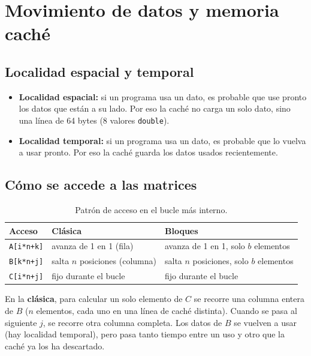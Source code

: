 \documentclass[11pt]{article}
\begin{document}
\section{Movimiento de datos y memoria caché}

\subsection{Localidad espacial y temporal}

\begin{itemize}
\item \textbf{Localidad espacial:} si un programa usa un dato, es probable que
      use pronto los datos que están a su lado. Por eso la caché no carga un
      solo dato, sino una línea de 64 bytes (8 valores \texttt{double}).
\item \textbf{Localidad temporal:} si un programa usa un dato, es probable que
      lo vuelva a usar pronto. Por eso la caché guarda los datos usados
      recientemente.
\end{itemize}

\subsection{Cómo se accede a las matrices}

\begin{table}[H]
\centering
\caption{Patrón de acceso en el bucle más interno.}
\label{tab:patron}
\begin{tabular}{lll}
\toprule
Acceso & Clásica & Bloques \\
\midrule
\texttt{A[i*n+k]} & avanza de 1 en 1 (fila) & avanza de 1 en 1, solo $b$ elementos \\
\texttt{B[k*n+j]} & salta $n$ posiciones (columna) & salta $n$ posiciones, solo $b$ elementos \\
\texttt{C[i*n+j]} & fijo durante el bucle & fijo durante el bucle \\
\bottomrule
\end{tabular}
\end{table}

En la \textbf{clásica}, para calcular un solo elemento de $C$ se recorre una
columna entera de $B$ ($n$ elementos, cada uno en una línea de caché
distinta). Cuando se pasa al siguiente $j$, se recorre otra columna completa.
Los datos de $B$ se vuelven a usar (hay localidad temporal), pero pasa
tanto tiempo entre un uso y otro que la caché ya los ha descartado.
\end{document}
